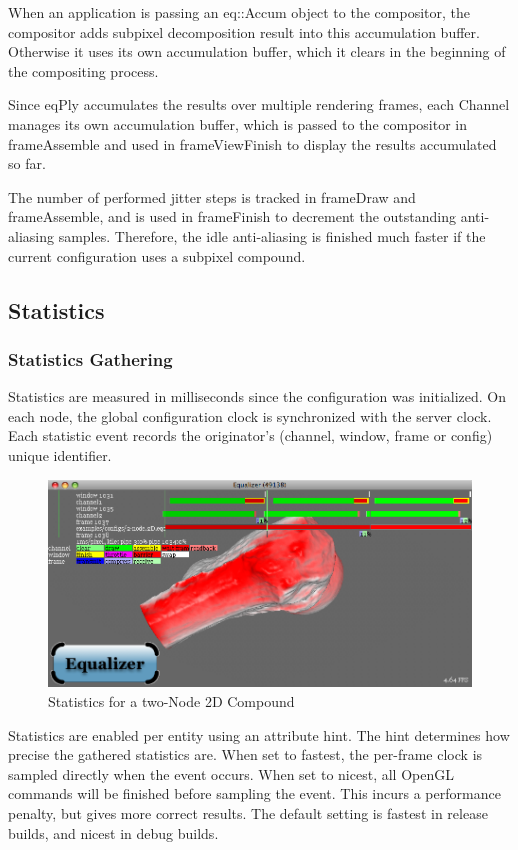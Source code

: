 \documentclass[10pt,a4]{scrartcl}
\begin{document}
When an application is passing an \textsf{eq::Accum} object to the compositor,
the compositor adds subpixel decomposition result into this accumulation
buffer. Otherwise it uses its own accumulation buffer, which it clears in the
beginning of the compositing process.

Since \textsf{eqPly} accumulates the results over multiple rendering frames,
each \textsf{Channel} manages its own accumulation buffer, which is passed to
the compositor in \textsf{frameAssemble} and used in \textsf{frameViewFinish} to
display the results accumulated so far.

The number of performed jitter steps is tracked in \textsf{frameDraw} and
\textsf{frameAssemble}, and is used in \textsf{frameFinish} to decrement the
outstanding anti-aliasing samples. Therefore, the idle anti-aliasing is finished
much faster if the current configuration uses a subpixel compound.

\subsection{\label{sStatistics}Statistics}

\subsubsection{Statistics Gathering}

Statistics are measured in milliseconds since the configuration was
initialized. On each node, the global configuration clock is synchronized
with the server clock. Each statistic event records the originator's
(channel, window, frame or config) unique identifier.

\begin{figure}
  \includegraphics[width=.618\textwidth]{images/statistics}
  {\caption{\label{fStatistics}Statistics for a two-Node 2D Compound}}
\end{figure}
Statistics are enabled per entity using an attribute hint. The hint
determines how precise the gathered statistics are. When set to
\textsf{fastest}, the per-frame clock is sampled directly when the event
occurs. When set to \textsf{nicest}, all OpenGL commands will be
finished before sampling the event. This incurs a performance penalty,
but gives more correct results. The default setting is fastest in
release builds, and nicest in debug builds.
\end{document}
